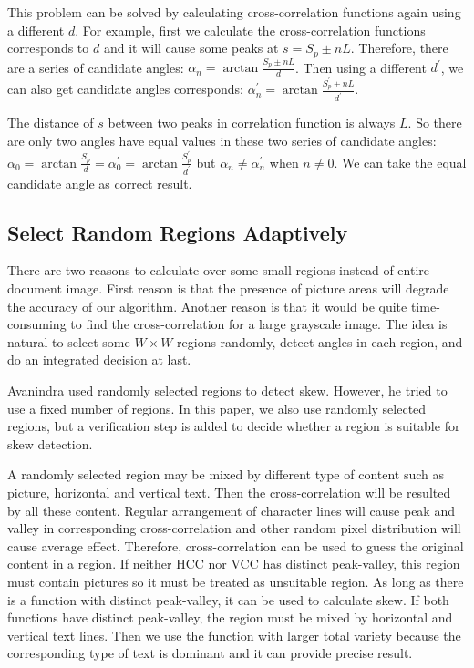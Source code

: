 \documentclass[conference]{IEEEtran}
\begin{document}
	This problem can be solved by calculating cross-correlation functions again using a different $d$. For example, first we calculate the cross-correlation functions corresponds to $d$ and it will cause some peaks at $s = S_{p}\pm nL$. Therefore, there are a series of candidate angles: $\alpha_{n}= \arctan\frac{S_{p}\pm nL}{d}$. Then using a different $d^{\prime}$, we can also get candidate angles corresponds: $\alpha_{n}^{\prime}= \arctan\frac{S_{p}^{\prime}\pm nL}{d^{\prime}}$.
	
	The distance of $s$ between two peaks in correlation function is always $L$. So there are only two angles have equal values in these two series of candidate angles: $\alpha_{0}= \arctan\frac{S_{p}}{d} = \alpha_{0}^{\prime}= \arctan\frac{S_{p}^{\prime}}{d^{\prime}}$ but $\alpha_{n} \neq \alpha_{n}^{\prime}$ when $n\neq 0$. We can take the equal candidate angle as correct result.
	
	\subsection{Select Random Regions Adaptively}
	There are two reasons to calculate over some small regions instead of entire document image. First reason is that the presence of picture areas will degrade the accuracy of our algorithm. Another reason is that it would be quite time-consuming to find the cross-correlation for a large grayscale image. The idea is natural to select some $W \times W$ regions randomly, detect angles in each region, and do an integrated decision at last.
	
	Avanindra \cite{avanindra97} used randomly selected regions to detect skew. However, he tried to use a fixed number of regions. In this paper, we also use randomly selected regions, but a verification step is added to decide whether a region is suitable for skew detection.
	
	A randomly selected region may be mixed by different type of content such as picture, horizontal and vertical text. Then the cross-correlation will be resulted by all these content. Regular arrangement of character lines will cause peak and valley in corresponding cross-correlation and other random pixel distribution will cause average effect. Therefore, cross-correlation can be used to guess the original content in a region. If neither HCC nor VCC has distinct peak-valley, this region must contain pictures so it must be treated as unsuitable region. As long as there is a function with distinct peak-valley, it can be used to calculate skew. If both functions have distinct peak-valley, the region must be mixed by horizontal and vertical text lines. Then we use the function with larger total variety because the corresponding type of text is dominant and it can provide precise result.
	
\end{document}
